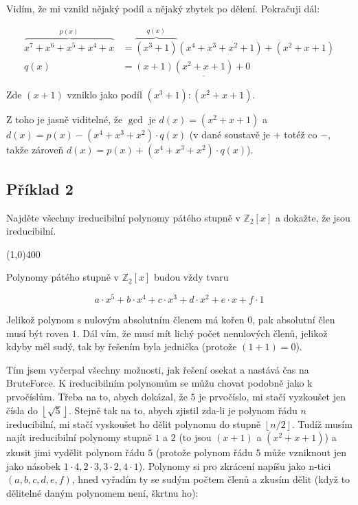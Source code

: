 \documentclass{article}
\begin{document}
Vidím, že mi vznikl nějaký podíl a nějaký zbytek po dělení. Pokračuji dál:

\begin{align*}
\overbrace{x^7 + x^6 + x^5 + x^4 + x}^{p(x)} & = \overbrace{(x^3 + 1)}^{q(x)}(x^4 + x^3 + x^2 + 1) + (x^2 + x + 1)  \\
q(x) & = (x+1)\underline{(x^2 + x + 1)} + 0 
\end{align*}

Zde $(x+1)$ vzniklo jako podíl $(x^3+1):(x^2 + x + 1)$.

Z toho je jasně viditelné, že $\gcd$ je $d(x) = (x^2 + x + 1)$ a $d(x)= p(x) - (x^4 + x^3 + x^2)\cdot q(x)$ (v dané soustavě je $+$ totéž co $-$, takže zároveň $d(x)= p(x) + (x^4 + x^3 + x^2)\cdot q(x)$).


\subsection{\label{priklad2-2}Příklad 2}
Najděte všechny ireducibilní polynomy pátého stupně v $\mathbb{Z}_2[x]$ a dokažte, že jsou ireducibilní.

\line(1,0){400}

Polynomy pátého stupně v $\mathbb{Z}_2[x]$ budou vždy tvaru

\[ a\cdot x^5 + b\cdot x^4 + c\cdot x^3 + d\cdot x^2 + e\cdot x + f\cdot1 \]

Jelikož polynom s nulovým absolutním členem má kořen $0$, pak absolutní člen musí být roven $1$. Dál vím, že musí mít lichý počet nenulových členů, jelikož kdyby měl sudý, tak by řešením byla jednička (protože $(1+1) = 0$). 

Tím jsem vyčerpal všechny možnosti, jak řešení osekat a nastává čas na BruteForce\texttrademark. K ireducibilním polynomům se můžu chovat podobně jako k prvočíslům. Třeba na to, abych dokázal, že $5$ je prvočíslo, mi stačí vyzkoušet jen čísla do $\left\lfloor \sqrt{5} \right\rfloor$. Stejně tak na to, abych zjistil zda-li je polynom řádu $n$ ireducibilní, mi stačí vyskoušet ho dělit polynomu do stupně  $\left\lfloor n/2 \right\rfloor$. Tudíž musím najít ireducibilní polynomy stupně $1$ a $2$ (to jsou $(x+1)$ a $(x^2 + x + 1)$) a zkusit jimi vydělit polynom řádu $5$ (protože polynom řádu $5$ může vzniknout jen jako násobek $1\cdot4, 2\cdot3, 3\cdot2, 4\cdot1$). Polynomy si pro zkrácení napíšu jako n-tici $(a,b,c,d,e,f)$, hned vyřadím ty se sudým počtem členů a zkusím dělit (když to dělitelné daným polynomem není, škrtnu ho):
\end{document}
